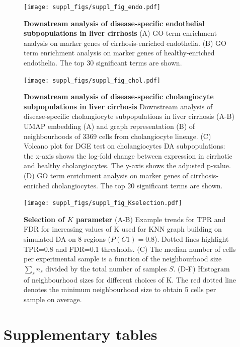 \documentclass[
]{article}
\begin{document}
\begin{figure}
\centering
\texttt{[image: suppl\_figs/suppl\_fig\_endo.pdf]}
\caption{\label{fig:sup-fig-liver-endo}\textbf{Downstream analysis of disease-specific endothelial subpopulations in liver cirrhosis}
(A) GO term enrichment analysis on marker genes of cirrhosis-enriched endothelia. (B) GO term enrichment analysis on marker genes of healthy-enriched endothelia. The top 30 significant terms are shown.}
\end{figure}




\begin{figure}
\centering
\texttt{[image: suppl\_figs/suppl\_fig\_chol.pdf]}
\caption{\label{fig:sup-fig-liver-chol}\textbf{Downstream analysis of disease-specific cholangiocyte subpopulations in liver cirrhosis}
Downstream analysis of disease-specific cholangiocyte subpopulations in liver cirrhosis
(A-B) UMAP embedding (A) and graph representation (B) of neighbourhoods of 3369 cells from cholangiocyte lineage.
(C) Volcano plot for DGE test on cholangiocytes DA subpopulations: the x-axis shows the log-fold change between expression in cirrhotic and healthy cholangiocytes. The y-axis shows the adjusted p-value.
(D) GO term enrichment analysis on marker genes of cirrhosis-enriched cholangiocytes. The top 20 significant terms are shown.}
\end{figure}







\begin{figure}
\centering
\texttt{[image: suppl\_figs/suppl\_fig\_Kselection.pdf]}
\caption{\label{fig:sup-fig-Kselection}\textbf{Selection of \(K\) parameter}
(A-B) Example trends for TPR and FDR for increasing values of K used for KNN graph building on simulated DA on 8 regions (\(P(C1) = 0.8\)). Dotted lines highlight TPR=0.8 and FDR=0.1 thresholds. (C) The median number of cells per experimental sample is a function of the neighbourhood size \(\sum_s{n_s}\) divided by the total number of samples \(S\). (D-F) Histogram of neighbourhood sizes for different choices of K. The red dotted line denotes the minimum neighbourhood size to obtain 5 cells per sample on average.}
\end{figure}




\newpage

\hypertarget{supplementary-tables}{%
\section*{Supplementary tables}\label{supplementary-tables}}
\end{document}
